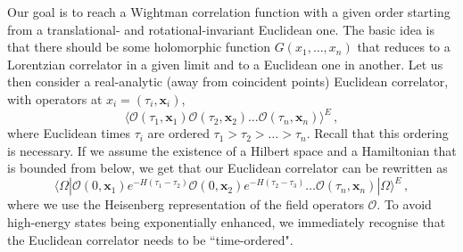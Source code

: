 Our goal is to reach a Wightman correlation function with a given order starting from a translational- and rotational-invariant Euclidean one. The basic idea is that there should be some holomorphic function $G(x_1,\dots,x_n)$ that reduces to a Lorentzian correlator in a given limit and to a Euclidean one in another. Let us then consider a real-analytic (away from coincident points) Euclidean correlator,
with operators at $x_i=(\tau_i, \textbf{x}_i)$,
\begin{equation}
  \label{eq:euclcorr0}
  \langle  \mathcal{O}(\tau_1,\textbf{x}_1)\mathcal{O}(\tau_2,\textbf{x}_2)\dots\mathcal{O}(\tau_n,\textbf{x}_n)\rangle^{E}\,,
\end{equation}
where Euclidean times $\tau_i$ are ordered $\tau_1>\tau_2>\dots>\tau_n$. Recall that this ordering is necessary. If we assume the existence of a Hilbert space and a Hamiltonian that is bounded from below, we get that our Euclidean correlator can be rewritten as
\begin{equation}
  \label{eq:euclcorr1}
  \langle \Omega| \mathcal{O}(0,\textbf{x}_1)e^{-H(\tau_1-\tau_2)}\mathcal{O}(0,\textbf{x}_2)e^{-H(\tau_2-\tau_3)}\dots\mathcal{O}(\tau_n,\textbf{x}_n) |\Omega\rangle^{E}\,,
\end{equation}
where we use the Heisenberg representation of the field operators $\mathcal{O}$. To avoid high-energy states being exponentially enhanced,
we immediately recognise that the Euclidean correlator needs to be ``time-ordered".

